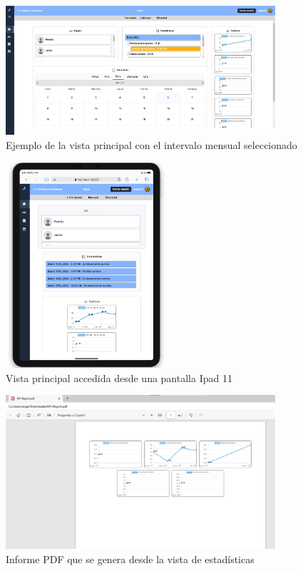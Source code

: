 \begin{figure}[H]
    \centering
    \includegraphics[width=10cm]{archivos/tfg_jorge/pruebas/home_mes}
    \caption{Ejemplo de la vista principal con el intervalo mensual seleccionado}\label{sistemass2}
\end{figure}

\begin{figure}[H]
    \centering
    \includegraphics[width=6cm]{archivos/tfg_jorge/pruebas/home_tablet}
    \caption{Vista principal accedida desde una pantalla Ipad 11}\label{sistemass2}
\end{figure}

\begin{figure}[H]
    \centering
    \includegraphics[width=10cm]{archivos/tfg_jorge/pruebas/kpi_report}
    \caption{Informe PDF que se genera desde la vista de estadísticas}\label{sistemass2}
\end{figure}


